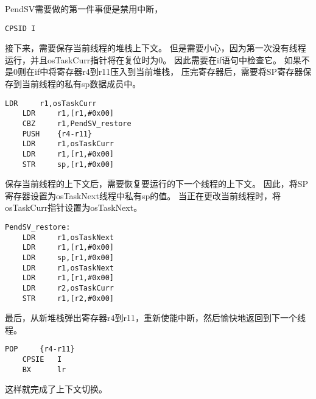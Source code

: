 PendSV需要做的第一件事便是禁用中断，
\begin{lstlisting}[language={[ANSI]C},keywordstyle=\color{blue!70},commentstyle=\color{red!50!green!50!blue!50},frame=shadowbox, rulesepcolor=\color{red!20!green!20!blue!20}]
    CPSID I
\end{lstlisting}
接下来，需要保存当前线程的堆栈上下文。
但是需要小心，因为第一次没有线程运行，并且osTaskCurr指针将在复位时为0。
因此需要在if语句中检查它。
如果不是0则在if中将寄存器r4到r11压入到当前堆栈，
压完寄存器后，需要将SP寄存器保存到当前线程的私有sp数据成员中。
\begin{lstlisting}[language={[ANSI]C},keywordstyle=\color{blue!70},commentstyle=\color{red!50!green!50!blue!50},frame=shadowbox, rulesepcolor=\color{red!20!green!20!blue!20}]
    LDR		r1,osTaskCurr
    LDR		r1,[r1,#0x00]
    CBZ		r1,PendSV_restore
	PUSH	{r4-r11}
	LDR		r1,osTaskCurr
	LDR		r1,[r1,#0x00]
	STR		sp,[r1,#0x00]
\end{lstlisting}

保存当前线程的上下文后，需要恢复要运行的下一个线程的上下文。
因此，将SP寄存器设置为osTaskNext线程中私有sp的值。
当正在更改当前线程时，将osTaskCurr指针设置为osTaskNext。
\begin{lstlisting}[language={[ANSI]C},keywordstyle=\color{blue!70},commentstyle=\color{red!50!green!50!blue!50},frame=shadowbox, rulesepcolor=\color{red!20!green!20!blue!20}]
PendSV_restore:
	LDR		r1,osTaskNext
	LDR		r1,[r1,#0x00]
	LDR		sp,[r1,#0x00]
	LDR		r1,osTaskNext
 	LDR		r1,[r1,#0x00]
 	LDR		r2,osTaskCurr
    STR		r1,[r2,#0x00]
\end{lstlisting}

最后，从新堆栈弹出寄存器r4到r11，重新使能中断，然后愉快地返回到下一个线程。
\begin{lstlisting}[language={[ANSI]C},keywordstyle=\color{blue!70},commentstyle=\color{red!50!green!50!blue!50},frame=shadowbox, rulesepcolor=\color{red!20!green!20!blue!20}]  
    POP		{r4-r11}
    CPSIE	I
	BX		lr
\end{lstlisting}

这样就完成了上下文切换。


